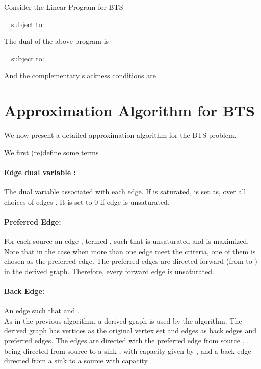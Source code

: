 \documentclass[11pt]{article}
\begin{document}
Consider the Linear Program for BTS 



\ \  subject to:



The dual of the above program is 



\ \  subject to:


And the complementary slackness conditions are





\section{Approximation Algorithm for BTS}
\label{sec_extend}

We now present a detailed  approximation algorithm for the BTS problem.

We first (re)define some terms

\paragraph*{Edge dual variable : }
The dual variable associated with each  edge. If  is saturated, 
 is 
set as,   
over all choices of edges  .
It is set to 0  if edge  is unsaturated.

\paragraph*{Preferred Edge: } 
For each source  an edge , termed , such that  is 
unsaturated and  is maximized. Note that in the case 
when more than one edge meet the criteria, one of them is chosen as the preferred
edge. The preferred edges are directed forward (from  to ) in the derived graph. 
Therefore, every forward edge is unsaturated. 
\paragraph*{Back Edge: }
An edge  such that  and .\\

As in the previous algorithm, a derived graph  is used by the algorithm.
The derived graph has vertices as the original vertex set and edges as back edges
and preferred edges. The edges are directed
with the preferred edge from source , , being directed from source
 to a sink , with capacity given by , 
and a back edge directed from a sink  to a source  with capacity .
\end{document}
